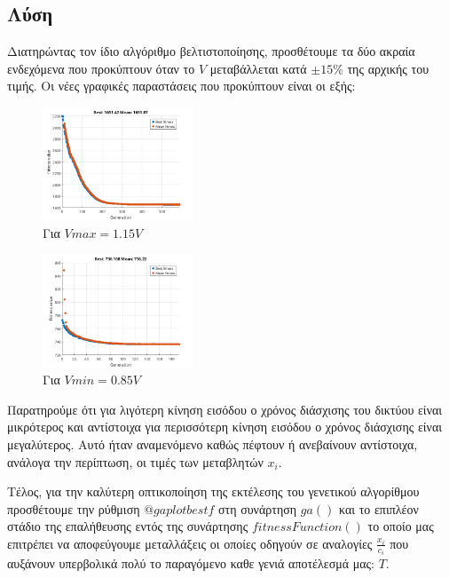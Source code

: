 \documentclass[twocolumn]{report}
\begin{document}
\subsection*{Λύση}
Διατηρώντας τον ίδιο αλγόριθμο βελτιστοποίησης, προσθέτουμε τα δύο ακραία ενδεχόμενα 
που προκύπτουν όταν το $V$ μεταβάλλεται κατά $\pm 15\%$ της αρχικής του τιμής.
Οι νέες γραφικές παραστάσεις που προκύπτουν είναι οι εξής:
\begin{figure}[H]
    \centering
    \includegraphics[width=0.4\textwidth]{media/plotVmax.png}
    \caption{Για $Vmax = 1.15V$}
\end{figure}
\begin{figure}[H]
    \centering
    \includegraphics[width=0.4\textwidth]{media/plotVmin.png}
    \caption{Για $Vmin = 0.85V$}
\end{figure}
Παρατηρούμε ότι για λιγότερη κίνηση εισόδου ο χρόνος διάσχισης του δικτύου είναι
μικρότερος και αντίστοιχα για περισσότερη κίνηση εισόδου ο χρόνος διάσχισης είναι
μεγαλύτερος. Αυτό ήταν αναμενόμενο καθώς πέφτουν ή ανεβαίνουν αντίστοιχα, ανάλογα
την περίπτωση, οι τιμές των μεταβλητών $x_i$.

Τέλος, για την καλύτερη οπτικοποίηση της εκτέλεσης του γενετικού αλγορίθμου προσθέτουμε
την ρύθμιση $@gaplotbestf$ στη συνάρτηση $ga()$ και το επιπλέον στάδιο της επαλήθευσης 
εντός της συνάρτησης $fitnessFunction()$ το οποίο μας επιτρέπει να αποφεύγουμε
μεταλλάξεις οι οποίες οδηγούν σε αναλογίες $\frac{x_i}{c_i}$ που αυξάνουν υπερβολικά πολύ το 
παραγόμενο καθε γενιά αποτέλεσμά μας: $T$. 

\end{document}
